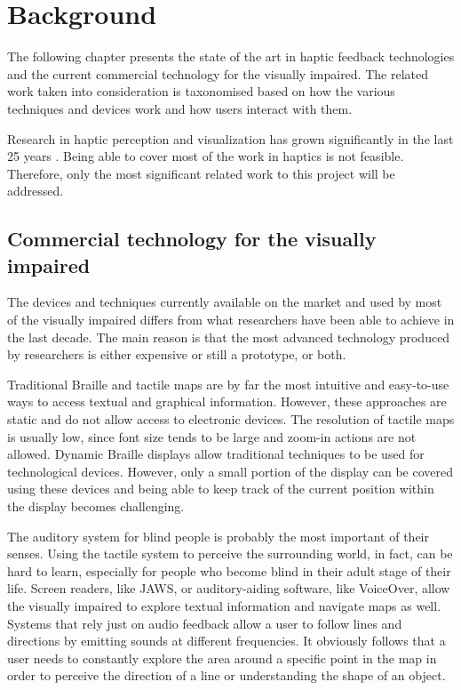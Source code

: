 \chapter{Background}

The following chapter presents the state of the art in haptic feedback technologies and the current commercial technology for the visually impaired. The related work taken into consideration is taxonomised based on how the various techniques and devices work and how users interact with them.

Research in haptic perception and visualization has grown significantly in the last 25 years \cite{roberts2007we}. Being able to cover most of the work in haptics is not feasible. Therefore, only the most significant related work to this project will be addressed.

\section{Commercial technology for the visually impaired}
The devices and techniques currently available on the market and used by most of the visually impaired differs from what researchers have been able to achieve in the last decade. The main reason is that the most advanced technology produced by researchers is either expensive or still a prototype, or both. 

Traditional Braille and tactile maps are by far the most intuitive and easy-to-use ways to access textual and graphical information. However, these approaches are static and do not allow access to electronic devices. The resolution of tactile maps is usually low, since font size tends to be large and zoom-in actions are not allowed. Dynamic Braille displays \cite{HumanWare, shimada2010development, blindMaps} allow traditional techniques to be used for technological devices. However, only a small portion of the display can be covered using these devices and being able to keep track of the current position within the display becomes challenging.

The auditory system for blind people is probably the most important of their senses. Using the tactile system to perceive the surrounding world, in fact, can be hard to learn, especially for people who become blind in their adult stage of their life. Screen readers, like JAWS\cite{JAWS}, or auditory-aiding software, like VoiceOver\cite{voiceOver}, allow the visually impaired to explore textual information and navigate maps as well. Systems that rely just on audio feedback allow a user to follow lines and directions by emitting sounds at different frequencies. It obviously follows that a user needs to constantly explore the area around a specific point in the map in order to perceive the direction of a line or understanding the shape of an object.    
    

